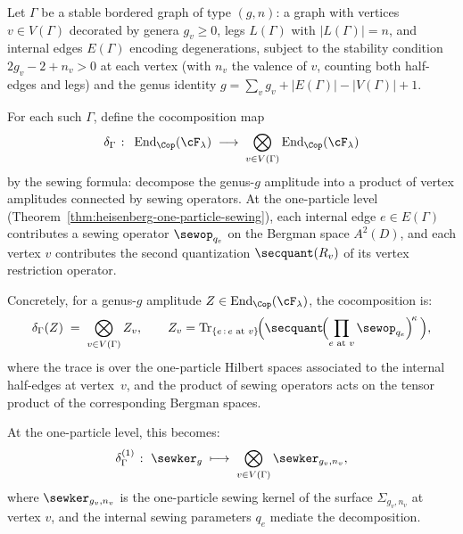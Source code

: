 \begin{construction}
\label{constr:heisenberg-cocomposition}
Let $\Gamma$ be a stable bordered graph of type $(g, n)$:
a graph with vertices $v \in V(\Gamma)$ decorated by genera
$g_v \geq 0$, legs $L(\Gamma)$ with $|L(\Gamma)| = n$, and
internal edges $E(\Gamma)$ encoding degenerations, subject to
the stability condition $2g_v - 2 + n_v > 0$ at each vertex
(with $n_v$ the valence of $v$, counting both half-edges and
legs) and the genus identity $g = \sum_v g_v + |E(\Gamma)| -
|V(\Gamma)| + 1$.

For each such $\Gamma$, define the cocomposition map
\begin{equation}\label{eq:heisenberg-cocomposition}
\delta_\Gamma
\;\colon\;
\operatorname{End}_{\Cop}(\cF_\lambda)
\;\longrightarrow\;
\bigotimes_{v \in V(\Gamma)}
\operatorname{End}_{\Cop}(\cF_\lambda)
\end{equation}
by the sewing formula: decompose the genus-$g$ amplitude into
a product of vertex amplitudes connected by sewing operators.
At the one-particle level
\textup{(}Theorem~\textup{\ref{thm:heisenberg-one-particle-sewing}}\textup{)},
each internal edge $e \in E(\Gamma)$ contributes a sewing
operator $\sewop_{q_e}$ on the Bergman space $A^2(D)$, and each
vertex $v$ contributes the second quantization
$\secquant(R_v)$ of its vertex restriction operator.

Concretely, for a genus-$g$ amplitude
$Z \in \operatorname{End}_{\Cop}(\cF_\lambda)$, the
cocomposition is:
\begin{equation}\label{eq:heisenberg-delta-gamma-formula}
\delta_\Gamma(Z)
\;=\;
\bigotimes_{v \in V(\Gamma)}
Z_v,
\qquad
Z_v
= \operatorname{Tr}_{\{e \,:\, e \text{ at } v\}}
\!\Bigl(
\secquant\!\Bigl(
\prod_{e \text{ at } v} \sewop_{q_e}
\Bigr)^{\!\kappa}\,\Bigr),
\end{equation}
where the trace is over the one-particle Hilbert spaces
associated to the internal half-edges at vertex~$v$, and the
product of sewing operators acts on the tensor product of
the corresponding Bergman spaces.

At the one-particle level, this becomes:
\begin{equation}\label{eq:heisenberg-one-particle-cocomposition}
\delta_\Gamma^{(1)}
\;\colon\;
\sewker_g
\;\longmapsto\;
\bigotimes_{v \in V(\Gamma)}
\sewker_{g_v, n_v},
\end{equation}
where $\sewker_{g_v, n_v}$ is the one-particle sewing kernel of the
surface $\Sigma_{g_v, n_v}$ at vertex $v$, and the internal sewing
parameters $q_e$ mediate the decomposition.
\end{construction}

